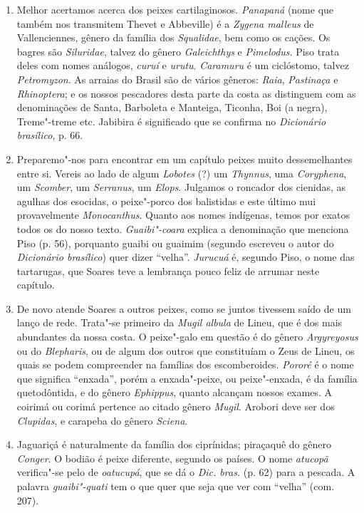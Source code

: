 \begin{enumerate}
\item  Melhor acertamos acerca dos peixes cartilaginosos. \textit{Panapaná}
(nome que também nos transmitem Thevet e Abbeville) é a \textit{Zygena malleus}
de Vallenciennes, gênero da família dos \textit{Squalidae}, bem como os cações. Os
bagres são \textit{Siluridae}, talvez do gênero \textit{Galeichthys} e \textit{Pimelodus}. Piso trata
deles com nomes análogos, \textit{curuí} e \textit{urutu}. \textit{Caramuru} é um ciclóstomo, talvez \textit{Petromyzon}. 
As arraias do Brasil são de vários gêneros: \textit{Raia}, \textit{Pastinaça} e
\textit{Rhinoptera}; e os nossos pescadores desta parte da costa as distinguem com
as denominações de Santa, Barboleta e Manteiga, Ticonha, Boi (a negra),
Treme"-treme etc. Jabibira é significado que se confirma no \textit{Dicionário brasílico}, p. 66.

\item  Preparemo"-nos para encontrar em um capítulo peixes muito 
dessemelhantes entre si. Vereis ao lado de algum \textit{Lobotes} (?) um \textit{Thynnus}, uma \textit{Coryphena}, 
um \textit{Scomber}, um \textit{Serranus}, um \textit{Elops}. Julgamos o roncador dos cienidas,
as agulhas dos esocidas, o peixe"-porco dos balistidas e este último mui 
provavelmente \textit{Monocanthus}. Quanto aos nomes indígenas, temos por exatos todos
os do nosso texto. \textit{Guaibi"-coara} explica a denominação que menciona
Piso (p. 56), porquanto guaibi ou guaimim (segundo escreveu o autor do
\textit{Dicionário brasílico}) quer dizer ``velha''.  \textit{Jurucuá} é, segundo Piso, o nome
das tartarugas, que Soares teve a lembrança pouco feliz de arrumar neste
capítulo.

\item  De novo atende Soares a outros peixes, como se juntos tivessem
saído de um lanço de rede. Trata"-se primeiro da \textit{Mugil albula} de Lineu,
que é dos mais abundantes da nossa costa. O peixe"-galo em questão é do gênero \textit{Argyreyosus} 
ou do \textit{Blepharis}, ou de algum dos 
outros que constituíam o Zeus de Lineu, os quais se podem compreender na famílias dos 
escomberoides. \textit{Pororé} é o nome que significa ``enxada'',  porém a enxada"-peixe, ou peixe"-enxada, é da família quetodôntida, 
e do gênero \textit{Ephippus}, quanto alcançam nossos exames. 
A coirimá ou corimá pertence ao citado gênero \textit{Mugil}. Arobori deve ser dos \textit{Clupidas}, e 
carapeba do gênero \textit{Sciena}.

\item  Jaguariçá é naturalmente da família dos ciprínidas; piraçaquê do
gênero \textit{Conger}. O bodião é peixe diferente, segundo os países. O nome
\textit{atucopã} verifica"-se pelo de \textit{oatucupá}, que se dá o \textit{Dic. bras.} (p. 62) para
a pescada. A palavra \textit{guaibi"-quati} tem o que quer que seja que ver com ``velha'' (com. 207).


\end{enumerate}
